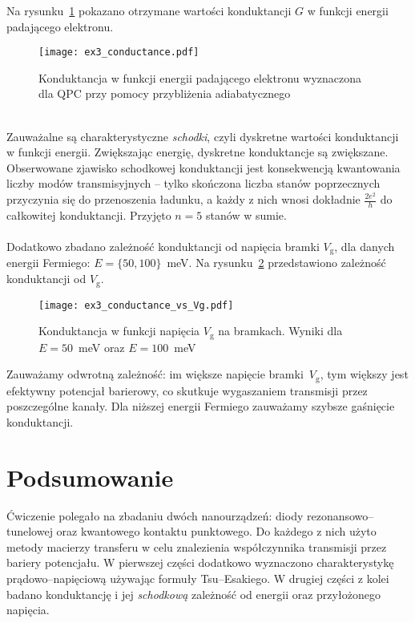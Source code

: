 \documentclass{article}
\begin{document}
Na rysunku~\ref{fig:ex3 conductance} pokazano otrzymane wartości konduktancji $G$ w funkcji energii padającego elektronu.\\
\begin{figure}[htp!]
    \centering
    \texttt{[image: ex3\_conductance.pdf]}
    \caption{Konduktancja w funkcji energii padającego elektronu wyznaczona dla QPC przy pomocy przybliżenia adiabatycznego}
    \label{fig:ex3 conductance}
\end{figure}
\\
Zauważalne są charakterystyczne \textit{schodki}, czyli dyskretne wartości konduktancji w funkcji energii.
Zwiększając energię, dyskretne konduktancje są zwiększane.
Obserwowane zjawisko schodkowej konduktancji jest konsekwencją kwantowania liczby modów transmisyjnych – tylko skończona liczba stanów poprzecznych przyczynia się do przenoszenia ładunku, a każdy z nich wnosi dokładnie $\frac{2e^2}{h}$ do całkowitej konduktancji.
Przyjęto $n=5$ stanów w sumie.\\
\\
Dodatkowo zbadano zależność konduktancji od napięcia bramki $V_{\text{g}}$, dla danych energii Fermiego: $E=\{50, 100\}$~meV.
Na rysunku~\ref{fig:conductance vg} przedstawiono zależność konduktancji od $V_{\text{g}}$.
\begin{figure}[htp!]
    \centering
    \texttt{[image: ex3\_conductance\_vs\_Vg.pdf]}
    \caption{Konduktancja w funkcji napięcia $V_{\text{g}}$ na bramkach. 
    Wyniki dla $E = 50$~meV oraz $E = 100$~meV}
    \label{fig:conductance vg}
\end{figure}
Zauważamy odwrotną zależność: im większe napięcie bramki~$V_{\text{g}}$, tym większy jest efektywny potencjał barierowy, co skutkuje wygaszaniem transmisji przez poszczególne kanały. 
Dla niższej energii Fermiego zauważamy szybsze gaśnięcie konduktancji.
\section{Podsumowanie}
Ćwiczenie polegało na zbadaniu dwóch nanourządzeń: diody rezonansowo--tunelowej oraz kwantowego kontaktu punktowego.
Do każdego z nich użyto metody macierzy transferu w celu znalezienia współczynnika transmisji przez bariery potencjału.
W pierwszej części dodatkowo wyznaczono charakterystykę prądowo--napięciową używając formuły Tsu--Esakiego.
W drugiej części z kolei badano konduktancję i jej \textit{schodkową} zależność od energii oraz przyłożonego napięcia. 
\end{document}
